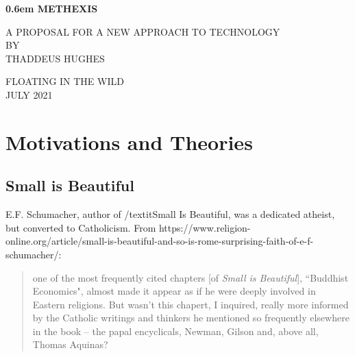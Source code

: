 \documentclass[10pt,letterpaper,openany]{book}
\begin{document}
\clearpage
\newcommand\nbvspace[1][3]{\vspace*{\stretch{#1}}}
\newcommand\nbstretchyspace{\spaceskip0.5em plus 0.25em minus 0.25em}
\newcommand{\nbtitlestretch}{\spaceskip0.6em}
\pagestyle{plain}
\begin{center}
  \bfseries
  \nbvspace[1]
  \Huge
  {\nbtitlestretch\huge
    METHEXIS}

  \nbvspace[1]
  \normalsize
  A PROPOSAL FOR A NEW APPROACH TO TECHNOLOGY\\
  
  \nbvspace[1]
  \small BY\\
  \Large THADDEUS HUGHES\\

  \nbvspace[2]

  \nbvspace[3]
  \normalsize

  \large
  FLOATING IN THE WILD \\
  \small JULY 2021 \\
\end{center}

\raggedbottom

\section{Motivations and Theories}

\subsection{Small is Beautiful}

E.F. Schumacher, author of /textit{Small Is Beautiful}, was a dedicated atheist, but converted to Catholicism. From https://www.religion-online.org/article/small-is-beautiful-and-so-is-rome-surprising-faith-of-e-f-schumacher/:

\begin{quote}
one of the most frequently cited chapters [of \textit{Small is Beautiful}], ``Buddhist Economics", almost made it appear as if he were deeply involved in Eastern religions. But wasn't this chapert, I inquired, really more informed by the Catholic writings and thinkers he mentioned so frequently elsewhere in the book -- the papal encyclicals, Newman, Gilson and, above all, Thomas Aquinas?
\end{quote}
\end{document}
